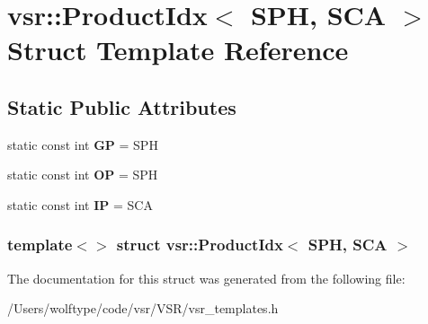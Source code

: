 \hypertarget{structvsr_1_1_product_idx_3_01_s_p_h_00_01_s_c_a_01_4}{\section{vsr\-:\-:Product\-Idx$<$ S\-P\-H, S\-C\-A $>$ Struct Template Reference}
\label{structvsr_1_1_product_idx_3_01_s_p_h_00_01_s_c_a_01_4}
}
\subsection*{Static Public Attributes}
\begin{DoxyCompactItemize}
\item 
\hypertarget{structvsr_1_1_product_idx_3_01_s_p_h_00_01_s_c_a_01_4_a838dd2912fd88d1033b2ccae28d2c811}{static const int {\bfseries G\-P} = S\-P\-H}\label{structvsr_1_1_product_idx_3_01_s_p_h_00_01_s_c_a_01_4_a838dd2912fd88d1033b2ccae28d2c811}

\item 
\hypertarget{structvsr_1_1_product_idx_3_01_s_p_h_00_01_s_c_a_01_4_a3febc503982082b26de5cb201fa3496c}{static const int {\bfseries O\-P} = S\-P\-H}\label{structvsr_1_1_product_idx_3_01_s_p_h_00_01_s_c_a_01_4_a3febc503982082b26de5cb201fa3496c}

\item 
\hypertarget{structvsr_1_1_product_idx_3_01_s_p_h_00_01_s_c_a_01_4_ad85f06adb32401f3c548087f5a430441}{static const int {\bfseries I\-P} = S\-C\-A}\label{structvsr_1_1_product_idx_3_01_s_p_h_00_01_s_c_a_01_4_ad85f06adb32401f3c548087f5a430441}

\end{DoxyCompactItemize}
\subsubsection*{template$<$$>$ struct vsr\-::\-Product\-Idx$<$ S\-P\-H, S\-C\-A $>$}



The documentation for this struct was generated from the following file\-:\begin{DoxyCompactItemize}
\item 
/\-Users/wolftype/code/vsr/\-V\-S\-R/vsr\-\_\-templates.\-h\end{DoxyCompactItemize}
